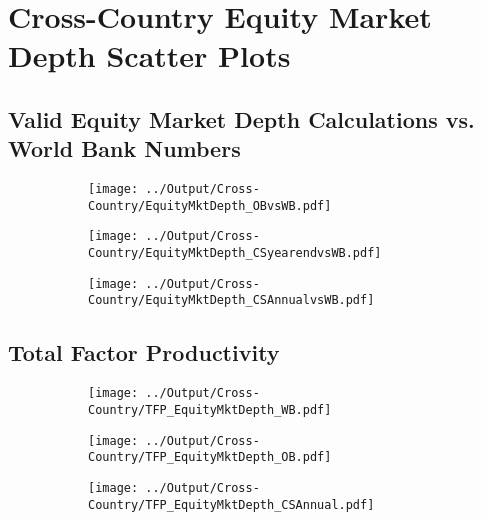 \documentclass[12pt,notitlepage]{article}
\begin{document}
\clearpage


\section{Cross-Country Equity Market Depth Scatter Plots}

\subsection{Valid Equity Market Depth Calculations vs. World Bank Numbers}
\begin{figure}[!htpb]
\centering
\begin{subfigure}{.49\textwidth}
    \centering
  \texttt{[image: ../Output/Cross-Country/EquityMktDepth\_OBvsWB.pdf]}
\end{subfigure}
\begin{subfigure}{.49\textwidth}
    \centering
 \texttt{[image: ../Output/Cross-Country/EquityMktDepth\_CSyearendvsWB.pdf]}
\end{subfigure}%
\begin{subfigure}{.49\textwidth}
    \centering
  \texttt{[image: ../Output/Cross-Country/EquityMktDepth\_CSAnnualvsWB.pdf]}
\end{subfigure}
\end{figure}
\pagebreak


\subsection{Total Factor Productivity}
\begin{figure}[!htpb]
\centering
\begin{subfigure}{.49\textwidth}
    \centering
 \texttt{[image: ../Output/Cross-Country/TFP\_EquityMktDepth\_WB.pdf]}
\end{subfigure}
\begin{subfigure}{.49\textwidth}
    \centering
  \texttt{[image: ../Output/Cross-Country/TFP\_EquityMktDepth\_OB.pdf]}
\end{subfigure}
\begin{subfigure}{.49\textwidth}
    \centering
  \texttt{[image: ../Output/Cross-Country/TFP\_EquityMktDepth\_CSAnnual.pdf]}
\end{subfigure}
\end{figure}
\pagebreak
\end{document}

